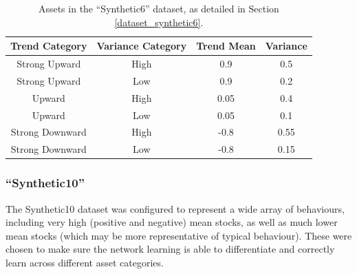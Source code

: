\documentclass[a4paper,11pt,oneside]{article}
\theoremstyle{plain}
\theoremstyle{definition}
\begin{document}
	\begin{table}[h]
		\centering
		\small
		\begin{tabular}{|c|c|c|c|}
			\hline
			\textbf{Trend Category} &\textbf{Variance Category} & \textbf{Trend Mean} & \textbf{Variance}\\\hline	
			{Strong Upward} & {High} & {0.9} & {0.5} \\\hline
			{Strong Upward} & {Low} & {0.9} & {0.2} \\\hline
			{Upward} & {High} & {0.05} & {0.4} \\\hline
			{Upward} & {Low} & {0.05} & {0.1} \\\hline
			{Strong Downward} & {High} & {-0.8} & {0.55} \\\hline
			{Strong Downward} & {Low} & {-0.8} & {0.15} \\\hline
		\end{tabular}
		\newline\newline
		\caption{Assets in the ``Synthetic6'' dataset, as detailed in Section \ref{dataset_synthetic6}.}\label{tab_synth6}
	\end{table}
	
	\subsubsection{``Synthetic10''}\label{dataset_synthetic10}
	
	The Synthetic10 dataset was configured to represent a wide array of behaviours, including very high (positive and negative) mean stocks, as well as much lower mean stocks (which may be more representative of typical behaviour). These were chosen to make sure the network learning is able to differentiate and correctly learn across different asset categories.
	
\end{document}
